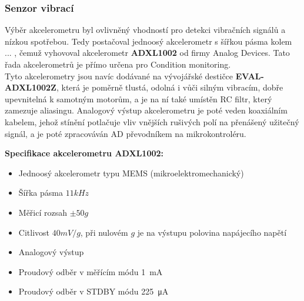 \subsubsection{Senzor vibrací}
    Výběr akcelerometru byl ovlivněný vhodností pro detekci vibračních signálů a nízkou spotřebou. Tedy postačoval jednoosý akcelerometr s šířkou pásma kolem ... , čemuž vyhovoval akcelerometr \textbf{ADXL1002} od firmy Analog Devices. Tato řada akcelerometrů je přímo určena pro Condition monitoring.\\
    Tyto akcelerometry jsou navíc dodávané na vývojářské destičce  \textbf{EVAL-ADXL1002Z}, která je poměrně tlustá, odolná i vůči silným vibracím, dobře upevnitelná k samotným motorům, a je na ní také umístěn RC filtr, který zamezuje aliasingu.
    Analogový výstup akcelerometru je poté veden koaxiálním kabelem, jehož stínění potlačuje vliv vnějších rušivých polí na přenášený užitečný signál, a je poté zpracováván AD převodníkem na mikrokontroléru. 
    
    
    


    \textbf{Specifikace akcelerometru ADXL1002:}
        \begin{itemize}
            \item Jednoosý akcelerometr typu MEMS (mikroelektromechanický)
            \item Šířka pásma $11 kHz$
            \item Měřicí rozsah $\pm50 g$
            \item Citlivost $40 mV/g$, při nulovém $g$ je na výstupu polovina napájecího napětí
            \item Analogový výstup
            \item Proudový odběr v měřícím módu \SI{1}{\milli\ampere}
            \item Proudový odběr v STDBY módu  \SI{225}{\micro\ampere} 
        \end{itemize}
        
